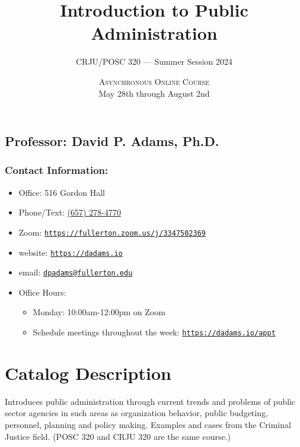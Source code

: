 \documentclass[11pt, letterpaper]{article}
\begin{document}
\title{\textbf{Introduction to Public Administration}}
\author{CRJU/POSC 320 — Summer Session 2024}
\date{\textsc{Asynchronous Online Course} \\ 
May 28th through August 2nd}
\maketitle


\subsection*{Professor: David P. Adams, Ph.D.}

\subsubsection*{Contact Information:}


\begin{itemize}
	\item Office: 516 Gordon Hall
	\item Phone/Text: \href{tel:+16572784770}{(657) 278-4770}
	\item Zoom: \href{https://fullerton.zoom.us/j/3347502369}{\texttt{https://fullerton.zoom.us/j/3347502369}}
	\item website: \href{https://dadams.io}{\texttt{https://dadams.io}}
	\item email: \href{dpadams@fullerton.edu}{\texttt{dpadams@fullerton.edu}}
	\item Office Hours:
        \begin{itemize}
            \item Monday: 10:00am-12:00pm on Zoom
            \item Schedule meetings throughout the week: \href{https://dadams.io/appt}{\texttt{https://dadams.io/appt}}
        \end{itemize}  
\end{itemize}


\section{Catalog Description}

Introduces public administration through current trends and problems of public sector agencies in such areas as organization behavior, public budgeting, personnel, planning and policy making. Examples and cases from the Criminal Justice field. (POSC 320 and CRJU 320 are the same course.)
\end{document}
